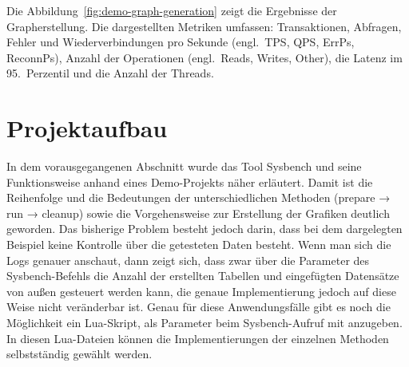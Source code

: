 Die Abbildung~\ref{fig:demo-graph-generation} zeigt die Ergebnisse der Grapherstellung.
Die dargestellten Metriken umfassen: Transaktionen, Abfragen, Fehler und Wiederverbindungen pro Sekunde (engl.\ TPS, QPS, ErrPs, ReconnPs), Anzahl der Operationen (engl.\ Reads, Writes, Other), die Latenz im 95.\ Perzentil und die Anzahl der Threads.


\section{Projektaufbau}\label{sec:projektaufbau-mit-beispiel}

In dem vorausgegangenen Abschnitt wurde das Tool Sysbench und seine Funktionsweise anhand eines Demo-Projekts näher erläutert.
Damit ist die Reihenfolge und die Bedeutungen der unterschiedlichen Methoden (prepare → run → cleanup) sowie die Vorgehensweise zur Erstellung der Grafiken deutlich geworden.
Das bisherige Problem besteht jedoch darin, dass bei dem dargelegten Beispiel keine Kontrolle über die getesteten Daten besteht.
Wenn man sich die Logs genauer anschaut, dann zeigt sich, dass zwar über die Parameter des Sysbench-Befehls die Anzahl der erstellten Tabellen und eingefügten Datensätze von außen gesteuert werden kann, die genaue Implementierung jedoch auf diese Weise nicht veränderbar ist.
Genau für diese Anwendungsfälle gibt es noch die Möglichkeit ein Lua-Skript, als Parameter beim Sysbench-Aufruf mit anzugeben.
In diesen Lua-Dateien können die Implementierungen der einzelnen Methoden selbstständig gewählt werden.

